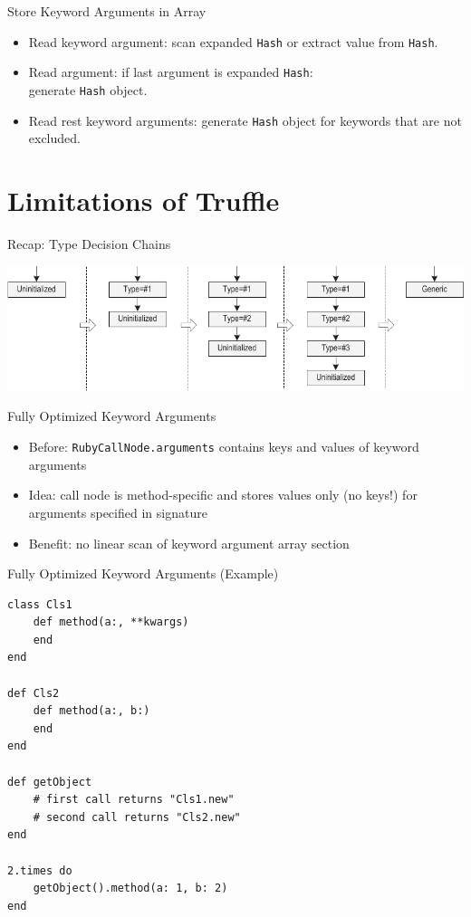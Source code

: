 \documentclass[xcolor=dvipsname,handout]{beamer} %
\begin{document}
\begin{frame}{Store Keyword Arguments in Array}
\begin{itemize}
    \item Read keyword argument: scan expanded \lstinline{Hash} or extract value from \lstinline{Hash}.
    \item Read argument: if last argument is expanded \lstinline{Hash}: \\ generate \lstinline{Hash} object.
    \item Read rest keyword arguments: generate \lstinline{Hash} object for keywords that are not excluded.
\end{itemize}
\end{frame}

\section{Limitations of Truffle}
\begin{frame}{Recap: Type Decision Chains}
\begin{table}
    \includegraphics[width=\textwidth]{type_chain.pdf}
\end{table}
\end{frame}

\begin{frame}{Fully Optimized Keyword Arguments}
\begin{itemize}
    \item Before: \lstinline{RubyCallNode.arguments} contains keys and values of keyword arguments
    \item Idea: call node is method-specific and stores values only (no keys!) for arguments specified in signature
    \item Benefit: no linear scan of keyword argument array section
\end{itemize}
\end{frame}

\begin{frame}[fragile]{Fully Optimized Keyword Arguments (Example)}
\begin{lstlisting}
class Cls1
    def method(a:, **kwargs)
    end
end

def Cls2
    def method(a:, b:)
    end
end

def getObject
    # first call returns "Cls1.new"
    # second call returns "Cls2.new"
end

2.times do
    getObject().method(a: 1, b: 2)
end
\end{lstlisting}
\end{frame}
\end{document}
